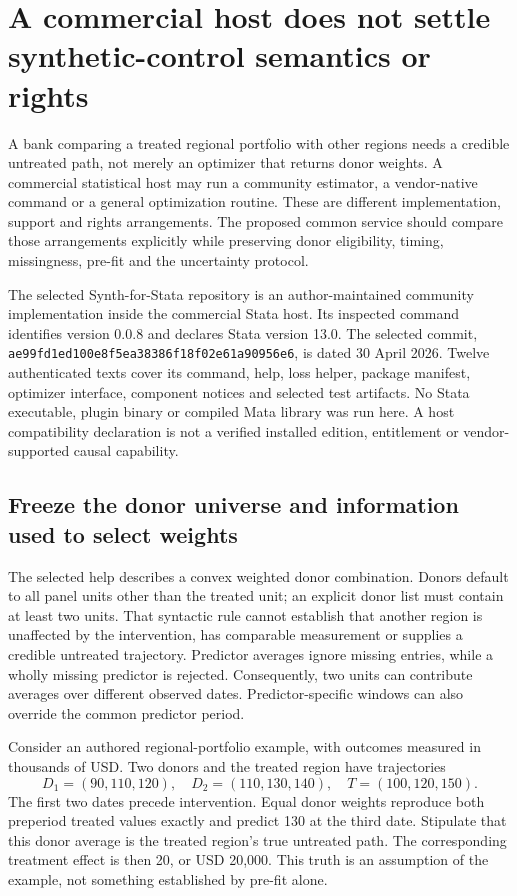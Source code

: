 \section{A commercial host does not settle synthetic-control semantics or rights}
\label{exec19:synth-scope}

A bank comparing a treated regional portfolio with other regions needs a
credible untreated path, not merely an optimizer that returns donor weights.
A commercial statistical host may run a community estimator, a vendor-native
command or a general optimization routine. These are different implementation,
support and rights arrangements. The proposed common service should compare
those arrangements explicitly while preserving donor eligibility, timing,
missingness, pre-fit and the uncertainty protocol.

The selected Synth-for-Stata repository is an author-maintained community
implementation inside the commercial Stata host. Its inspected command identifies
version 0.0.8 and declares Stata version 13.0. The selected commit,
\texttt{ae99fd1ed100e8f5ea38386f18f02e61a90956e6}, is dated 30 April 2026.
Twelve authenticated texts cover its command, help, loss helper, package
manifest, optimizer interface, component notices and selected test artifacts.
No Stata executable, plugin binary or compiled Mata library was run here.
A host compatibility declaration is not a verified installed edition,
entitlement or vendor-supported causal capability.~\citep{exec19_synth_stata_source}

\subsection{Freeze the donor universe and information used to select weights}
\label{exec19:synth-donors}

The selected help describes a convex weighted donor combination. Donors default
to all panel units other than the treated unit; an explicit donor list must
contain at least two units. That syntactic rule cannot establish that another
region is unaffected by the intervention, has comparable measurement or supplies
a credible untreated trajectory. Predictor averages ignore missing entries,
while a wholly missing predictor is rejected. Consequently, two units can
contribute averages over different observed dates. Predictor-specific windows
can also override the common predictor period.~\citep{exec19_synth_stata_source}

Consider an authored regional-portfolio example, with outcomes measured in
thousands of USD. Two donors and the treated region have trajectories
\begin{equation}
 D_1=(90,110,120),\quad D_2=(110,130,140),\quad T=(100,120,150).
 \label{exec19:synth-paths}
\end{equation}
The first two dates precede intervention. Equal donor weights reproduce both
preperiod treated values exactly and predict 130 at the third date. Stipulate
that this donor average is the treated region's true untreated path. The
corresponding treatment effect is then 20, or USD 20,000. This truth is an
assumption of the example, not something established by pre-fit alone.
\citep{exec19_synth_contract_reference}

